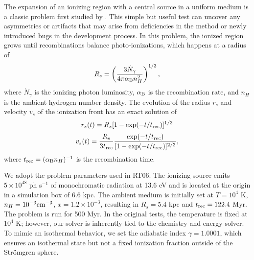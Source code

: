 \documentclass[12pt,preprint]{aastex}
\begin{document}
The expansion of an ionizing region with a central source in a uniform
medium is a classic problem first studied by \citet{Stroemgren39}.
This simple but useful test can uncover any asymmetries or artifacts
that may arise from deficiencies in the method or newly introduced
bugs in the development process.  In this problem, the ionized region
grows until recombinations balance photo-ionizations, which happens at
a radius of
%
\begin{equation}
  \label{eqn:Rstr}
  R_s = \left(\frac{3\dot{N}_\gamma}{4\pi \alpha_{\rm B} n_H^2}\right)^{1/3},
\end{equation}
where $\dot{N}_\gamma$ is the ionizing photon luminosity, $\alpha_{\rm
  B}$ is the recombination rate, and $n_H$ is the ambient hydrogen
number density.  The evolution of the radius $r_s$ and velocity $v_s$
of the ionization front has an exact solution of
%
\begin{equation}
  \label{eqn:rstr}
  r_s(t) = R_s [ 1 - \exp(-t/t_{\rm rec}) ]^{1/3}
\end{equation}
\begin{equation}
  \label{eqn:vstr}
  v_s(t) = \frac{R_s}{3t_{\rm rec}} \frac{\exp(-t/t_{\rm rec})} {[1 -
    \exp(-t/t_{\rm rec})]^{2/3}},
\end{equation}
where $t_{\rm rec} = (\alpha_{\rm B} n_H)^{-1}$ is the recombination
time.

We adopt the problem parameters used in RT06.  The ionizing
source emits $5 \times 10^{48}$ ph s$^{-1}$ of monochromatic radiation
at 13.6 eV and is located at the origin in a simulation box of 6.6
kpc.  The ambient medium is initially set at $T=10^4$ K, $n_H =
10^{-3} \cubecm$, $x = 1.2 \times 10^{-3}$, resulting in $R_s = 5.4$
kpc and $t_{\rm rec} = 122.4$ Myr.  The problem is run for 500 Myr.
In the original tests, the temperature is fixed at $10^4$ K; however,
our solver is inherently tied to the chemistry and energy solver.  To
mimic an isothermal behavior, we set the adiabatic index $\gamma =
1.0001$, which ensures an isothermal state but not a fixed ionization
fraction outside of the Str\"{o}mgren sphere.
\end{document}
